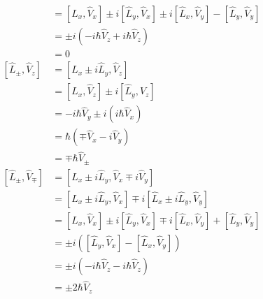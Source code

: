 \documentclass{article}
\begin{document}
\begin{enumerate}
\begin{align*}
                                     & = [\hat{L}_x, \hat{V}_x] \pm i [\hat{L}_y, \hat{V}_x] \pm i [\hat{L}_x, \hat{V}_y] - [\hat{L}_y, \hat{V}_y] \\
                                     & = \pm i (-i \hbar \hat{V}_z + i \hbar \hat{V}_z)                                                            \\
                                     & = 0                                                                                                         \\
          [\hat{L}_\pm, \hat{V}_z]   & = [\hat{L}_x \pm i \hat{L}_y, \hat{V}_z]                                                                    \\
                                     & = [\hat{L}_x, \hat{V}_z] \pm i [\hat{L}_y, \hat{V}_z]                                                       \\
                                     & = -i \hbar \hat{V}_y \pm i (i \hbar \hat{V}_x)                                                              \\
                                     & = \hbar (\mp \hat{V}_x - i \hat{V}_y)                                                                       \\
                                     & = \mp \hbar \hat{V}_\pm                                                                                     \\
          [\hat{L}_\pm, \hat{V}_\mp] & = [\hat{L}_x \pm i \hat{L}_y, \hat{V}_x \mp i \hat{V}_y]                                                    \\
                                     & = [\hat{L}_x \pm i \hat{L}_y, \hat{V}_x] \mp i [\hat{L}_x \pm i \hat{L}_y, \hat{V}_y]                       \\
                                     & = [\hat{L}_x, \hat{V}_x] \pm i [\hat{L}_y, \hat{V}_x] \mp i [\hat{L}_x, \hat{V}_y] + [\hat{L}_y, \hat{V}_y] \\
                                     & = \pm i ([\hat{L}_y, \hat{V}_x] - [\hat{L}_x, \hat{V}_y])                                                   \\
                                     & = \pm i (-i \hbar \hat{V}_z - i \hbar \hat{V}_z)                                                            \\
                                     & = \pm 2 \hbar \hat{V}_z
        \end{align*}


\end{enumerate}
\end{document}
